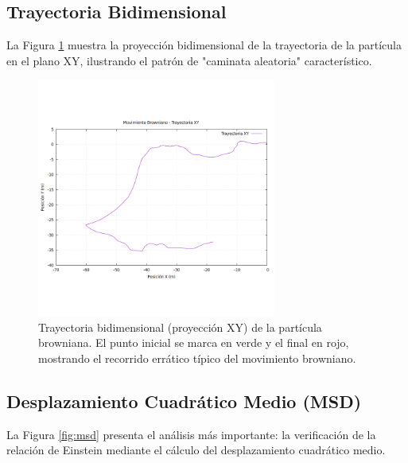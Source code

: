 \documentclass[11pt,a4paper]{article}
\begin{document}
\subsection{Trayectoria Bidimensional}
La Figura \ref{fig:trayectoria} muestra la proyección bidimensional de la trayectoria de la partícula en el plano XY, ilustrando el patrón de "caminata aleatoria" característico.

\begin{figure}[h!]
    \centering
    \includegraphics[width=0.7\textwidth]{../results/browniano_sim_plot_trayectoria_xy.png}
    \caption{Trayectoria bidimensional (proyección XY) de la partícula browniana. El punto inicial se marca en verde y el final en rojo, mostrando el recorrido errático típico del movimiento browniano.}
    \label{fig:trayectoria}
\end{figure}

\subsection{Desplazamiento Cuadrático Medio (MSD)}
La Figura \ref{fig:msd} presenta el análisis más importante: la verificación de la relación de Einstein mediante el cálculo del desplazamiento cuadrático medio.
\end{document}
